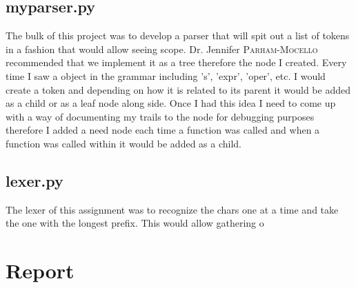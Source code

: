 \documentclass[letterpaper,10pt]{article}
\def\supervisor{Dr. Jennifer \textsc{Parham-Mocello }} %
\begin{document}
\subsection{myparser.py}
\begin{mdframed}[style=MyFrame]
The bulk of this project was to develop a parser that will spit out a list of tokens in a fashion that would allow seeing scope. \supervisor recommended that we implement it as a tree therefore the node I created. Every time I saw a object in the grammar including 's', 'expr', 'oper', etc. I would create a token and depending on how it is related to its parent it would be added as a child or as a leaf node along side. Once I had this idea I need to come up with a way of documenting my trails to the node for debugging purposes therefore I added a need node each time a function was called and when a function was called within it would be added as a child. 
\end{mdframed}
\subsection{lexer.py}
\begin{mdframed}[style=MyFrame]
The lexer of this assignment was to recognize the chars one at a time and take the one with the longest prefix. This would allow gathering o 
\end{mdframed}

\newpage
\section{Report}
\end{document}
